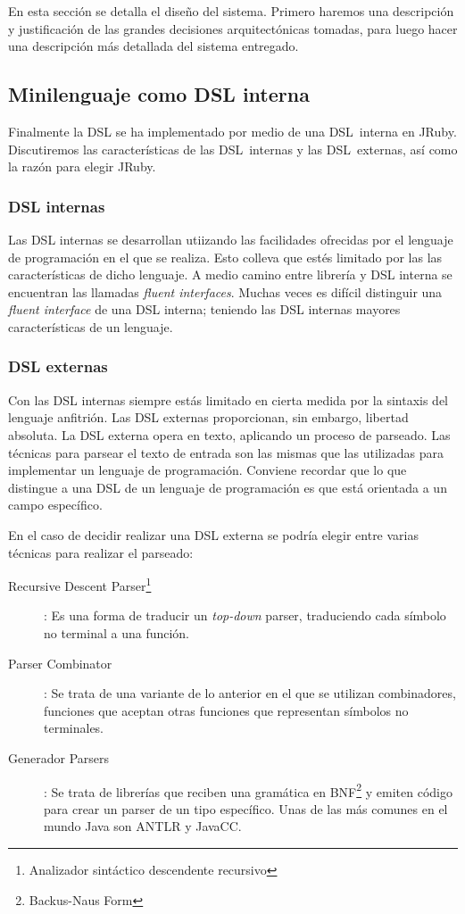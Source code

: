 En esta sección se detalla el diseño del sistema. Primero haremos una
descripción y justificación de las grandes decisiones arquitectónicas
tomadas, para luego hacer una descripción más detallada del sistema
entregado.

\subsection{Minilenguaje como DSL interna}
Finalmente la DSL se ha implementado por medio de una DSL~interna en
JRuby. Discutiremos las características de las DSL~internas y las
DSL~externas, así como la razón para elegir JRuby.
\subsubsection{DSL internas}

Las DSL internas se desarrollan utiizando las facilidades ofrecidas
por el lenguaje de programación en el que se realiza. Esto colleva que
estés limitado por las las características de dicho lenguaje. A medio
camino entre librería y DSL interna se encuentran las llamadas
\emph{fluent interfaces}. Muchas veces es difícil distinguir una
\emph{fluent interface} de una DSL interna; teniendo las DSL internas
mayores características de un lenguaje.

\subsubsection{DSL externas}

Con las DSL internas siempre estás limitado en cierta medida por la
sintaxis del lenguaje anfitrión. Las DSL externas proporcionan, sin
embargo, libertad absoluta. La DSL externa opera en texto, aplicando
un proceso de parseado. Las técnicas para parsear el texto de entrada
son las mismas que las utilizadas para implementar un lenguaje de
programación. Conviene recordar que lo que distingue a una DSL de un
lenguaje de programación es que está orientada a un campo específico.

En el caso de decidir realizar una DSL externa se podría elegir entre
varias técnicas para realizar el parseado:
\begin{description}
\item[Recursive Descent Parser\footnote{Analizador sintáctico
    descendente recursivo}]: Es una forma de traducir un
  \emph{top-down} parser, traduciendo cada símbolo no terminal a una
  función.
\item[Parser Combinator]: Se trata de una variante de lo anterior en
  el que se utilizan combinadores, funciones que aceptan otras
  funciones que representan símbolos no terminales.
\item[Generador Parsers]: Se trata de librerías que reciben una
  gramática en BNF\footnote{Backus-Naus Form} y emiten código para
  crear un parser de un tipo específico. Unas de las más comunes en
  el mundo Java son ANTLR y JavaCC.
\end{description}

